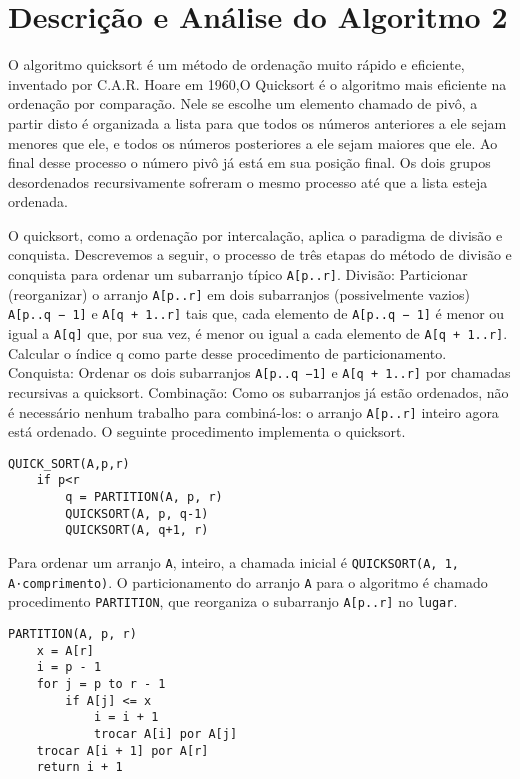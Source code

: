 \documentclass{article}
\begin{document}
\section{Descrição e Análise do Algoritmo 2}

O algoritmo quicksort é um método de ordenação muito rápido e eficiente, inventado por C.A.R. Hoare em 1960,O Quicksort é o algoritmo mais eficiente na ordenação por comparação. Nele se escolhe um elemento chamado de pivô, a partir disto é organizada a lista para que todos os números anteriores a ele sejam menores que ele, e todos os números posteriores a ele sejam maiores que ele. Ao final desse processo o número pivô já está em sua posição final. Os dois grupos desordenados recursivamente sofreram o mesmo processo até que a lista esteja ordenada.

O quicksort, como a ordenação por intercalação, aplica o paradigma de divisão e conquista. Descrevemos a seguir, o processo de três etapas do método de divisão e conquista para ordenar um subarranjo típico \texttt{A[p..r]}. Divisão: Particionar (reorganizar) o arranjo \texttt{A[p..r]} em dois subarranjos (possivelmente vazios) \texttt{A[p..q − 1]} e \texttt{A[q + 1..r]} tais que, cada elemento de \texttt{A[p..q − 1]} é menor ou igual a \texttt{A[q]} que, por sua vez, é menor ou igual a cada elemento de \texttt{A[q + 1..r]}. Calcular o índice q como parte desse procedimento de particionamento. Conquista: Ordenar os dois subarranjos \texttt{A[p..q −1]} e \texttt{A[q + 1..r]} por chamadas recursivas a quicksort. Combinação: Como os subarranjos já estão ordenados, não é necessário nenhum trabalho para combiná-los: o arranjo \texttt{A[p..r]} inteiro agora está ordenado. O seguinte procedimento implementa o quicksort.

\begin{verbatim}
QUICK_SORT(A,p,r)
    if p<r
        q = PARTITION(A, p, r)
        QUICKSORT(A, p, q-1)
        QUICKSORT(A, q+1, r)
\end{verbatim}

Para ordenar um arranjo \texttt{A}, inteiro, a chamada inicial é \texttt{QUICKSORT(A, 1, A⋅comprimento)}.
O particionamento do arranjo \texttt{A} para o algoritmo é chamado procedimento \texttt{PARTITION}, que reorganiza o subarranjo \texttt{A[p..r]} no \texttt{lugar}.

\begin{verbatim}
PARTITION(A, p, r)
    x = A[r]
    i = p - 1
    for j = p to r - 1
        if A[j] <= x
            i = i + 1
            trocar A[i] por A[j]
    trocar A[i + 1] por A[r]
    return i + 1
\end{verbatim}
\end{document}

